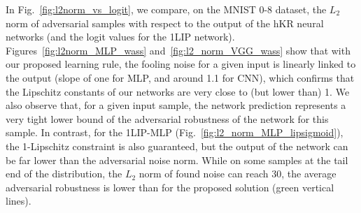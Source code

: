 \documentclass{article}
\begin{document}

In Fig.~\ref{fig:l2norm_vs_logit}, we compare, on the MNIST 0-8 dataset, the $L_2$ norm of adversarial samples with respect to the output of the hKR neural networks (and the logit values for the 1LIP network). Figures~\ref{fig:l2norm_MLP_wass} and~\ref{fig:l2_norm_VGG_wass}  show that with our proposed learning rule, the fooling noise for a given input is linearly linked to the output (slope of one for MLP,  and around 1.1 for CNN), which confirms that the Lipschitz constants of our networks are very close to (but lower than) 1.
We also observe that, for a given input sample, the network prediction represents a very tight lower bound of the adversarial robustness of the network for this sample. In contrast, for the 1LIP-MLP (Fig.~\ref{fig:l2_norm_MLP_lipsigmoid}), the 1-Lipschitz constraint is also guaranteed, but the output of the network can be far lower than the adversarial noise norm.%
While on some samples at the tail end of the distribution, the  $L_2$ norm of found noise can reach 30, the average adversarial robustness is lower  than for the proposed solution (green vertical lines).
\end{document}
